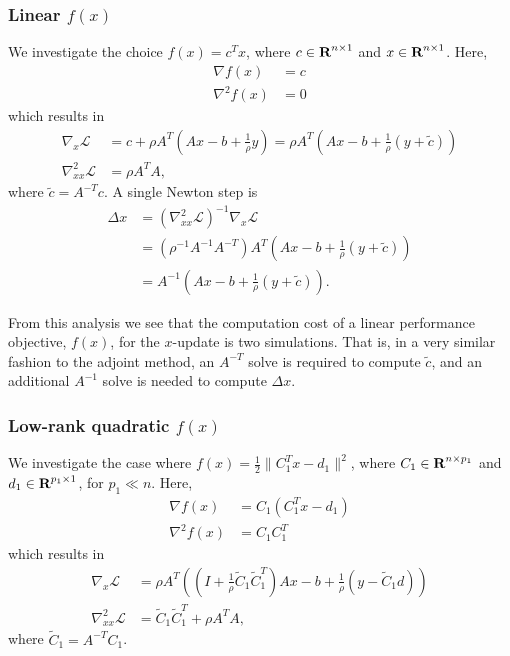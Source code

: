 \documentclass{article}
\newcommand{\inv}[1]{\frac{1}{#1}}
\newcommand{\tC}{\tilde{C}}
\begin{document}
\subsubsection{Linear $f(x)$}
We investigate the choice $f(x) = c^T x$, 
    where $c \in {\mbox{\bf R}}^{n \times 1}$
    and $x \in {\mbox{\bf R}}^{n \times 1}$.
Here,
    \begin{subequations}\begin{align}
    \nabla f(x) &= c \\
    \nabla^2 f(x) &= 0
    \end{align}\end{subequations}
    which results in
    \begin{subequations}\begin{align}
    \nabla_x \mathcal{L} &= c + \rho A^T (A x - b + \inv{\rho} y) 
        = \rho A^T (Ax - b + \inv{\rho}(y + \tilde{c})) \\
    \nabla_{xx}^2 \mathcal{L} &= \rho A^T A,
    \end{align}\end{subequations}
    where $\tilde{c} = A^{-T} c$.
A single Newton step is
    \begin{equation}\begin{split}
    \Delta x &= (\nabla_{xx}^2 \mathcal{L})^{-1} \nabla_x \mathcal{L} \\
        &= (\rho^{-1} A^{-1} A^{-T}) 
            A^T (A x - b + \inv{\rho}(y + \tilde c)) \\
        &= A^{-1}(A x - b + \inv{\rho}(y + \tilde c)).
    \end{split}\end{equation}

From this analysis we see that 
    the computation cost of a linear performance objective, $f(x)$, 
    for the $x$-update is two simulations.
That is, in a very similar fashion to the adjoint method,
    an $A^{-T}$ solve is required to compute $\tilde{c}$,
    and an additional $A^{-1}$ solve is needed to compute $\Delta x$.

\subsubsection{Low-rank quadratic $f(x)$}
We investigate the case where $f(x) = \frac{1}{2}\|C_1^T x - d_1\|^2$,
    where $C_1 \in {\mbox{\bf R}}^{n \times p_1}$
    and $d_1 \in {\mbox{\bf R}}^{p_1 \times 1}$, for $p_1 \ll n$.
Here,
    \begin{subequations}\begin{align}
    \nabla f(x) &= C_1 (C_1^T x - d_1) \\
    \nabla^2 f(x) &= C_1 C_1^T
    \end{align}\end{subequations}
    which results in
    \begin{subequations}\begin{align}
    \nabla_x \mathcal{L} &= \rho A^T ((I + \inv{\rho}\tC_1\tC_1^T)Ax
        - b + \inv{\rho}(y - \tC_1 d)) \\
    \nabla_{xx}^2 \mathcal{L} &= \tC_1\tC_1^T + \rho A^T A,
    \end{align}\end{subequations}
    where $\tC_1 = A^{-T}C_1$.
\end{document}
